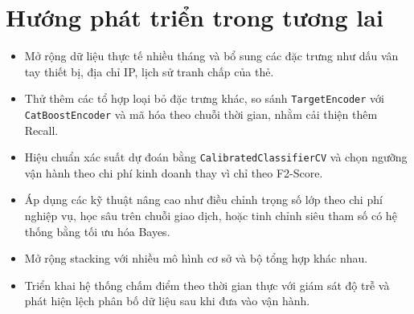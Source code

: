 \section{Hướng phát triển trong tương lai}
\begin{itemize}
    \item Mở rộng dữ liệu thực tế nhiều tháng và bổ sung các đặc trưng như dấu vân tay thiết bị, địa chỉ IP, lịch sử tranh chấp của thẻ.
    \item Thử thêm các tổ hợp loại bỏ đặc trưng khác, so sánh \texttt{TargetEncoder} với \texttt{CatBoostEncoder} và mã hóa theo chuỗi thời gian, nhằm cải thiện thêm Recall.
    \item Hiệu chuẩn xác suất dự đoán bằng \texttt{CalibratedClassifierCV} và chọn ngưỡng vận hành theo chi phí kinh doanh thay vì chỉ theo F2-Score.
    \item Áp dụng các kỹ thuật nâng cao như điều chỉnh trọng số lớp theo chi phí nghiệp vụ, học sâu trên chuỗi giao dịch, hoặc tinh chỉnh siêu tham số có hệ thống bằng tối ưu hóa Bayes.
    \item Mở rộng stacking với nhiều mô hình cơ sở và bộ tổng hợp khác nhau.
    \item Triển khai hệ thống chấm điểm theo thời gian thực với giám sát độ trễ và phát hiện lệch phân bố dữ liệu sau khi đưa vào vận hành.
\end{itemize}
